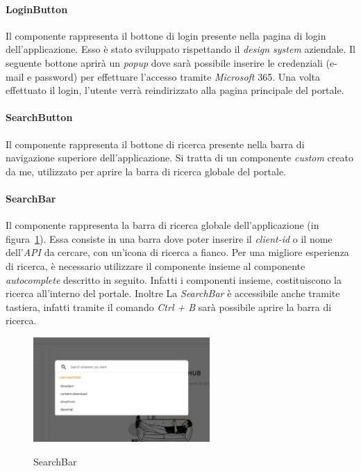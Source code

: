 
\paragraph{LoginButton}\label{par:login-button}
Il componente rappresenta il bottone di login presente nella pagina di login dell'applicazione. Esso è stato sviluppato rispettando il \textit{design system} aziendale.
Il seguente bottone aprirà un \textit{popup} dove sarà possibile inserire le credenziali (e-mail e password) per effettuare l'accesso tramite \textit{Microsoft} 365.
Una volta effettuato il login, l'utente verrà reindirizzato alla pagina principale del portale.

\paragraph{SearchButton}\label{par:search-button}
Il componente rappresenta il bottone di ricerca presente nella barra di navigazione superiore dell'applicazione.
Si tratta di un componente \textit{custom} creato da me, utilizzato per aprire la barra di ricerca globale del portale. 

\paragraph{SearchBar}\label{par:search-bar}
Il componente rappresenta la barra di ricerca globale dell'applicazione (in figura~\ref{fig:search-bar}). 
Essa consiste in una barra dove poter inserire il \textit{client-id} o il nome dell'\textit{API} da cercare,
con un'icona di ricerca a fianco. Per una migliore esperienza di ricerca, è necessario utilizzare il componente insieme al componente \textit{autocomplete} descritto in seguito.
Infatti i componenti insieme, costituiscono la ricerca all'interno del portale. Inoltre La \textit{SearchBar} è accessibile anche tramite tastiera,
infatti tramite il comando \textit{Ctrl + B} sarà possibile aprire la barra di ricerca.\\

\begin{figure}[ht]
  \centering
  \includegraphics[width=0.6\textwidth, alt={Barra di ricerca globale dell'applicazione}]{images/frontend/SearchBar.jpg}
  \caption{SearchBar}\label{fig:search-bar}
\end{figure}

